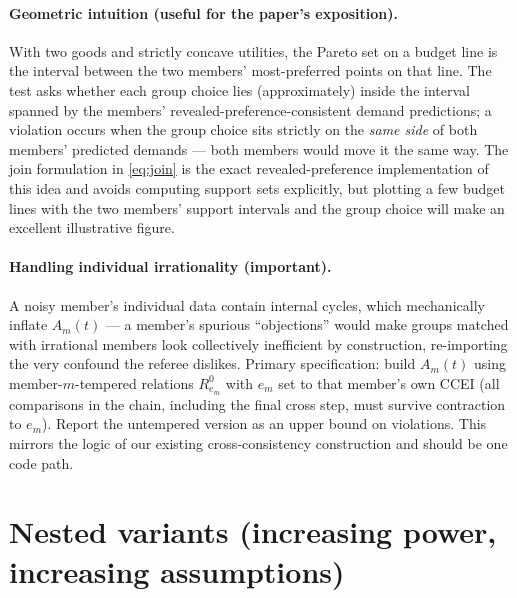 \documentclass[11pt]{article}
\theoremstyle{remark}
\begin{document}
\paragraph{Geometric intuition (useful for the paper's exposition).}
With two goods and strictly concave utilities, the Pareto set on a budget line is the interval between the two members' most-preferred points on that line. The test asks whether each group choice lies (approximately) inside the interval spanned by the members' revealed-preference-consistent demand predictions; a violation occurs when the group choice sits strictly on the \emph{same side} of both members' predicted demands --- both members would move it the same way. The join formulation in \eqref{eq:join} is the exact revealed-preference implementation of this idea and avoids computing \citet{varian1982} support sets explicitly, but plotting a few budget lines with the two members' support intervals and the group choice will make an excellent illustrative figure.

\paragraph{Handling individual irrationality (important).}
A noisy member's individual data contain internal cycles, which mechanically inflate $A_m(t)$ --- a member's spurious ``objections'' would make groups matched with irrational members look collectively inefficient by construction, re-importing the very confound the referee dislikes. Primary specification: build $A_m(t)$ using member-$m$-tempered relations $R^0_{e_m}$ with $e_m$ set to that member's own CCEI (all comparisons in the chain, including the final cross step, must survive contraction to $e_m$). Report the untempered version as an upper bound on violations. This mirrors the logic of our existing cross-consistency construction and should be one code path.

\section{Nested variants (increasing power, increasing assumptions)}\label{sec:variants}
\end{document}
